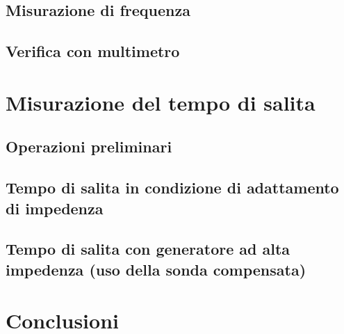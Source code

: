 \documentclass{article}
\begin{document}
\subsection{Misurazione di frequenza}

\subsection{Verifica con multimetro}

\section{Misurazione del tempo di salita}

\subsection{Operazioni preliminari}

\subsection{Tempo di salita in condizione di adattamento di impedenza}

\subsection{Tempo di salita con generatore ad alta impedenza (uso della sonda compensata)}



\section{Conclusioni}
\end{document}
